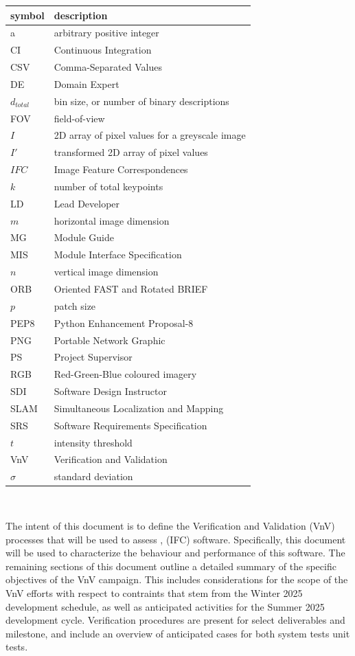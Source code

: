 \documentclass[12pt, titlepage]{article}
\begin{document}
\renewcommand{\arraystretch}{1.2}
\begin{tabular}{l l} 
  \toprule		
  \textbf{symbol} & \textbf{description}\\
  \midrule
  a & arbitrary positive integer\\
  CI & Continuous Integration\\
  CSV & Comma-Separated Values\\
  DE & Domain Expert \\
  $d_{total}$ & bin size, or number of binary descriptions \\
  FOV & field-of-view\\
  $I$ & 2D array of pixel values for a greyscale image \\
  $I'$ & transformed 2D array of pixel values\\
  $IFC$ & Image Feature Correspondences\\
  $k$ & number of total keypoints\\
  LD & Lead Developer \\
  $m$ & horizontal image dimension\\
  MG & Module Guide \\
  MIS & Module Interface Specification\\
  $n$ & vertical image dimension\\
  ORB & Oriented FAST and Rotated BRIEF\\
  $p$ & patch size\\
  PEP8 & Python Enhancement Proposal-8\\
  PNG & Portable Network Graphic\\
  PS & Project Supervisor\\
  RGB & Red-Green-Blue coloured imagery\\
  SDI & Software Design Instructor\\
  SLAM & Simultaneous Localization and Mapping\\
  SRS & Software Requirements Specification\\
  $t$ & intensity threshold \\
  VnV & Verification and Validation\\
  $\sigma$ & standard deviation\\
  \bottomrule
\end{tabular}\\

\newpage

\noindent The intent of this document is to define the Verification and Validation (VnV) processes
that will be used to assess \progname, (IFC) software. Specifically, this document will be used to 
characterize the behaviour and performance of this software. The remaining sections of this document 
outline a detailed summary of the specific objectives of the VnV campaign. This includes considerations 
for the scope of the VnV efforts with respect to contraints that stem from the Winter 2025
development schedule, as well as anticipated activities for the Summer 2025 development cycle.
Verification procedures are present for select deliverables and milestone, and include 
an overview of anticipated cases for both system tests unit tests.
\end{document}
